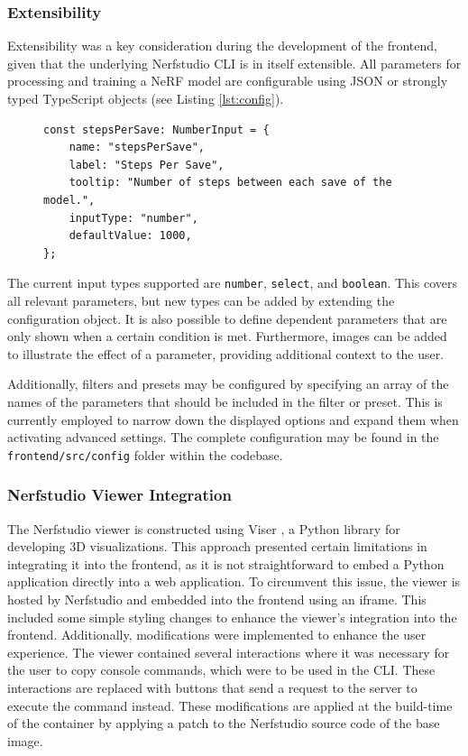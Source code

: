 \subsubsection{Extensibility}

Extensibility was a key consideration during the development of the frontend, given that the underlying Nerfstudio CLI is in itself extensible.
All parameters for processing and training a NeRF model are configurable using JSON or strongly typed TypeScript objects (see Listing \ref{lst:config}).

\begin{figure}[htb]
\begin{lstlisting}[style=ES6, caption=Minimal parameter configuration for 'Steps Per Save' input., label=lst:config]
const stepsPerSave: NumberInput = {
	name: "stepsPerSave",
	label: "Steps Per Save",
	tooltip: "Number of steps between each save of the model.",
	inputType: "number",
	defaultValue: 1000,
};
\end{lstlisting}
\end{figure}

The current input types supported are \texttt{number}, \texttt{select}, and \texttt{boolean}. 
This covers all relevant parameters, but new types can be added by extending the configuration object. 
It is also possible to define dependent parameters that are only shown when a certain condition is met. 
Furthermore, images can be added to illustrate the effect of a parameter, providing additional context to the user.

Additionally, filters and presets may be configured by specifying an array of the names of the parameters that should be included in the filter or preset.
This is currently employed to narrow down the displayed options and expand them when activating advanced settings. 
The complete configuration may be found in the \texttt{frontend/src/config} folder within the codebase.

\subsubsection{Nerfstudio Viewer Integration}

The Nerfstudio viewer is constructed using Viser \cite{noauthor_nerfstudio-projectviser_2024}, a Python library for developing 3D visualizations.
This approach presented certain limitations in integrating it into the frontend, as it is not straightforward to embed a Python application directly into a web application.
To circumvent this issue, the viewer is hosted by Nerfstudio and embedded into the frontend using an iframe.
This included some simple styling changes to enhance the viewer's integration into the frontend.
Additionally, modifications were implemented to enhance the user experience.
The viewer contained several interactions where it was necessary for the user to copy console commands, which were to be used in the CLI.
These interactions are replaced with buttons that send a request to the server to execute the command instead. 
These modifications are applied at the build-time of the container by applying a patch to the Nerfstudio source code of the base image.

